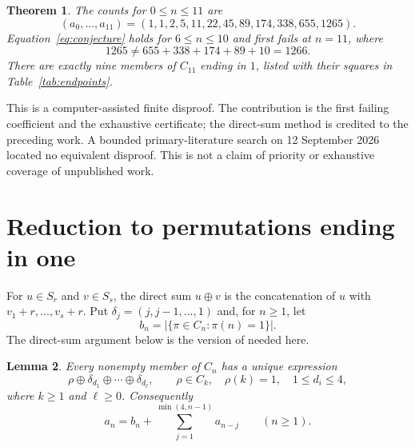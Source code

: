 \documentclass[11pt,a4paper]{article}
\newtheorem{theorem}{Theorem}
\newtheorem{lemma}[theorem]{Lemma}
\begin{document}
\begin{theorem}\label{thm:main}
The counts for $0\leq n\leq11$ are
\[
 (a_0,\ldots,a_{11})=(1,1,2,5,11,22,45,89,174,338,655,1265).
\]
Equation~\eqref{eq:conjecture} holds for $6\leq n\leq10$ and first fails at
$n=11$, where
\[
 1265\ne655+338+174+89+10=1266.
\]
There are exactly nine members of $C_{11}$ ending in $1$, listed with their
squares in Table~\ref{tab:endpoints}.
\end{theorem}

This is a computer-assisted finite disproof. The contribution is the first
failing coefficient and the exhaustive certificate; the direct-sum method is
credited to the preceding work. A bounded primary-literature search on
12 September 2026 located no equivalent disproof. This is not a claim of
priority or exhaustive coverage of unpublished work.

\section{Reduction to permutations ending in one}

For $u\in S_r$ and $v\in S_s$, the direct sum $u\oplus v$ is the
concatenation of $u$ with $v_1+r,\ldots,v_s+r$. Put
$\delta_j=(j,j-1,\ldots,1)$ and, for $n\geq1$, let
\[
 b_n=|\{\pi\in C_n:\pi(n)=1\}|.
\]
The direct-sum argument below is the version of
\cite[proof of Theorem~4.2]{ArcherBourne2026} needed here.

\begin{lemma}\label{lem:sum}
Every nonempty member of $C_n$ has a unique expression
\[
 \rho\oplus\delta_{d_1}\oplus\cdots\oplus\delta_{d_\ell},
 \qquad \rho\in C_k,\quad \rho(k)=1,\quad 1\leq d_i\leq4,
\]
where $k\geq1$ and $\ell\geq0$. Consequently
\begin{equation}\label{eq:endpoint}
 a_n=b_n+\sum_{j=1}^{\min(4,n-1)}a_{n-j}\qquad(n\geq1).
\end{equation}
\end{lemma}
\end{document}
